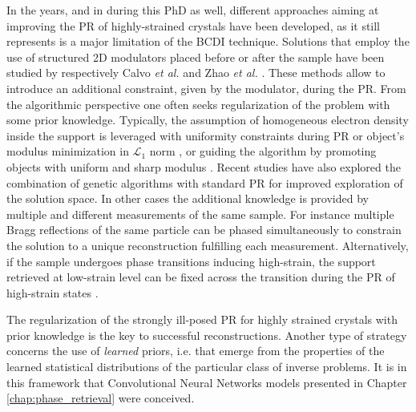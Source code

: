 In the years, and in during this PhD as well, different approaches aiming at improving the PR of highly-strained crystals 
have been developed, as it still represents is a major limitation of the BCDI technique.
Solutions that employ the use of structured 2D modulators placed before or after the sample have been studied by respectively 
Calvo \textit{et al.} \cite{Calvo_2024} and Zhao \textit{et al.} \cite{Zhao_2023}. These methods allow to introduce an 
additional constraint, given by the modulator, during the PR. From the algorithmic perspective one often seeks regularization 
of the problem with some prior knowledge. Typically, the assumption of homogeneous electron density inside the support 
is leveraged with uniformity constraints during PR \cite{Minkevich2007_virginie, Minkevich2008_baumbach, Madsen2021} or 
object's modulus minimization in $\mathcal{L}_1$ norm \cite{NewtonStrain_2010}, or guiding the algorithm by promoting 
objects with uniform and sharp modulus \cite{Ulvestad2017_Guided}. Recent studies have also explored the combination 
of genetic algorithms with standard PR \cite{WilkinGenetic_2021} for improved exploration of the solution space. 
In other cases the additional knowledge is provided by multiple and different measurements of the same sample. For 
instance multiple Bragg reflections of the same particle can be phased simultaneously \cite{Gao_2021} to constrain the 
solution to a unique reconstruction fulfilling each measurement. Alternatively, if the sample undergoes phase transitions 
inducing high-strain, the support retrieved at low-strain level can be fixed across the transition during the PR of 
high-strain states \cite{Wang_2020}. 

The regularization of the strongly ill-posed PR for highly strained crystals with prior knowledge is the key to 
successful reconstructions. Another type of strategy concerns the use of \textit{learned} priors, i.e. that emerge from 
the properties of the learned statistical distributions of the particular class of inverse problems. It is in this 
framework that Convolutional Neural Networks models presented in Chapter \ref{chap:phase_retrieval} were conceived. 




